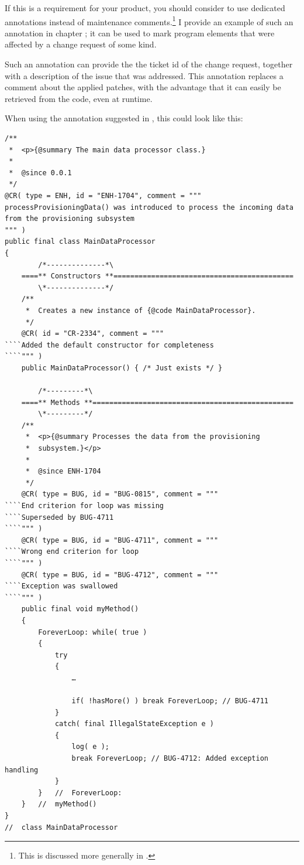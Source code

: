 If this is a requirement for your product, you should consider to use dedicated annotations instead of maintenance comments.\footnote{This is discussed more generally in .} I provide an example of such an annotation in chapter ; it can be used to mark program elements that were affected by a change request of some kind.

Such an annotation can provide the the ticket id of the change request, together with a description of the issue that was addressed. This annotation replaces a comment about the applied patches, with the advantage that it can easily be retrieved from the code, even at runtime.

When using the annotation suggested in , this could look like this:
\begin{lstlisting}
/**
 *  <p>{@summary The main data processor class.}
 *
 *  @since 0.0.1
 */
@CR( type = ENH, id = "ENH-1704", comment = """
processProvisioningData() was introduced to process the incoming data
from the provisioning subsystem
""" )
public final class MainDataProcessor
{
        /*--------------*\
    ====** Constructors **===========================================
        \*--------------*/
    /**
     *  Creates a new instance of {@code MainDataProcessor}.
     */
    @CR( id = "CR-2334", comment = """
````Added the default constructor for completeness
````""" )
    public MainDataProcessor() { /* Just exists */ }
    
        /*---------*\
    ====** Methods **================================================
        \*---------*/
    /**
     *  <p>{@summary Processes the data from the provisioning
     *  subsystem.}</p>
     *
     *  @since ENH-1704
     */
    @CR( type = BUG, id = "BUG-0815", comment = """
````End criterion for loop was missing
````Superseded by BUG-4711
````""" )
    @CR( type = BUG, id = "BUG-4711", comment = """
````Wrong end criterion for loop
````""" )
    @CR( type = BUG, id = "BUG-4712", comment = """
````Exception was swallowed
````""" )
    public final void myMethod()
    {
        ForeverLoop: while( true )
        {
            try
            {
                …
            
                if( !hasMore() ) break ForeverLoop; // BUG-4711
            }
            catch( final IllegalStateException e )
            {
                log( e );
                break ForeverLoop; // BUG-4712: Added exception handling
            }
        }   //  ForeverLoop:
    }   //  myMethod()
}
//  class MainDataProcessor
\end{lstlisting}

